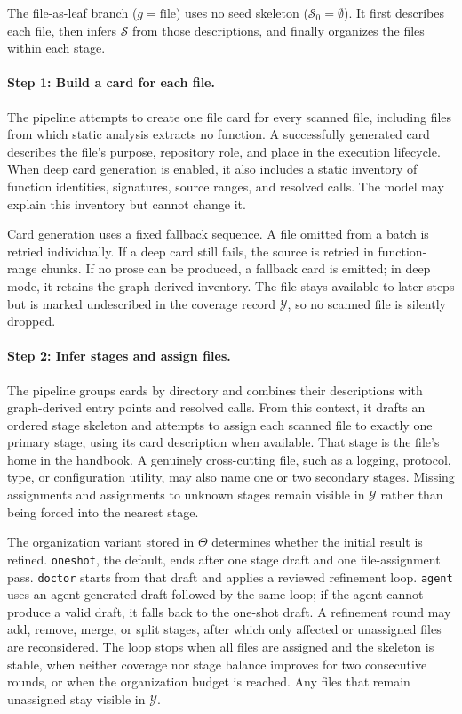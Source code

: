 \documentclass[]{ailab}
\newcommand{\hblarge}{\textsf{file-as-leaf}}
\begin{document}
The \hblarge{} branch ($g=\mathrm{file}$) uses no seed skeleton
($\mathcal{S}_0=\emptyset$). It first describes each file, then infers
$\mathcal{S}$ from those descriptions, and finally organizes the files within
each stage.

\paragraph{Step 1: Build a card for each file.}
The pipeline attempts to create one file card for every scanned file,
including files from which static analysis extracts no function. A successfully
generated card describes the file's purpose, repository role, and place in the
execution lifecycle. When deep card generation is enabled, it also includes a
static inventory of function identities, signatures, source ranges, and resolved
calls. The model may explain this inventory but cannot change it.

Card generation uses a fixed fallback sequence. A file omitted from a batch is
retried individually. If a deep card still fails, the source is retried in
function-range chunks. If no prose can be produced, a fallback card is emitted;
in deep mode, it retains the graph-derived inventory. The file stays available to
later steps but is marked undescribed in the coverage record $\mathcal{Y}$, so no
scanned file is silently dropped.

\paragraph{Step 2: Infer stages and assign files.}
The pipeline groups cards by directory and combines their descriptions with
graph-derived entry points and resolved calls. From this context, it drafts an
ordered stage skeleton and attempts to assign each scanned file to
exactly one primary stage, using its card description when available. That stage
is the file's home in the handbook. A genuinely
cross-cutting file, such as a logging, protocol, type, or configuration utility,
may also name one or two secondary stages. Missing assignments and assignments to
unknown stages remain visible in $\mathcal{Y}$ rather than being forced into the
nearest stage.

The organization variant stored in $\Theta$ determines whether the initial
result is refined.
\texttt{oneshot}, the default, ends after one stage draft and one file-assignment
pass. \texttt{doctor} starts from that draft and applies a reviewed refinement
loop. \texttt{agent} uses an agent-generated draft followed by the same loop; if
the agent cannot produce a valid draft, it falls back to the one-shot draft. A
refinement round may add, remove, merge, or split stages, after which only
affected or unassigned files are reconsidered. The loop stops when all files are
assigned and the skeleton is stable, when neither coverage nor stage balance
improves for two consecutive rounds, or when the organization budget is reached.
Any files that remain unassigned stay visible in $\mathcal{Y}$.
\end{document}
